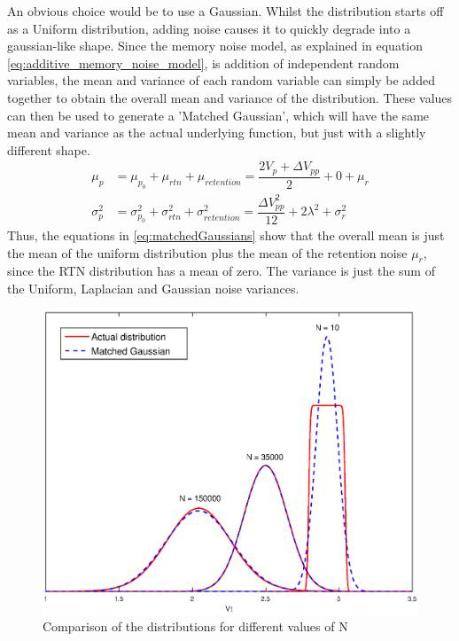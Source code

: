 \documentclass[11pt]{article}
\numberwithin{equation}{subsection}
\begin{document}
An obvious choice would be to use a Gaussian. Whilst the distribution starts off as a Uniform distribution, adding noise causes it to quickly degrade into a gaussian-like shape. Since the memory noise model, as explained in equation \ref{eq:additive_memory_noise_model}, is addition of independent random variables, the mean and variance of each random variable can simply be added together to obtain the overall mean and variance of the distribution. These values can then be used to generate a 'Matched Gaussian', which will have the same mean and variance as the actual underlying function, but just with a slightly different shape. 
\begin{equation} \label{eq:matchedGaussians}
\begin{aligned}
\mu_p &= \mu_{p_0} + \mu_{rtn} + \mu_{retention} = \dfrac{2 V_p + \Delta V_{pp}}{2} + 0 +\mu_r \\
\sigma_p^2 &= \sigma^2_{p_0} + \sigma^2_{rtn} + \sigma^2_{retention} = \dfrac{\Delta V_{pp}^2}{12} + 2\lambda^2 + \sigma^2_{r}
\end{aligned}
\end{equation}
Thus, the equations in \ref{eq:matchedGaussians} show that the overall mean is just the mean of the uniform distribution plus the mean of the retention noise $\mu_r$, since the RTN distribution has a mean of zero. The variance is just the sum of the Uniform, Laplacian and Gaussian noise variances.
\begin{figure}[ht]
\centering
\includegraphics[scale=0.6]{matched_gaussian}
\caption{Comparison of the distributions for different values of N}
\label{fig:MMGaussianVsFull}
\end{figure}
\end{document}
